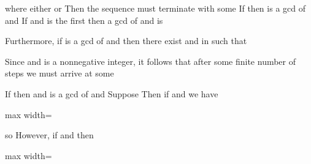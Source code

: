 \documentclass[11pt,oneside]{article}
\begin{document}
\begin{BookBody}
\noindent where either  or  Then the sequence  must terminate with some  If  then  is a gcd of  and  If  and  is the first  then a gcd of  and  is 

\end{BookBody}

\BookNarrativetrue

\begin{BookBody}

Furthermore, if  is a gcd of  and  then there exist \BookInline{\lambda } and \BookInline{\mu } in  such that 

 Since  and  is a nonnegative integer, it follows that after some finite number of steps we must arrive at some 

If  then  and  is a gcd of  and  Suppose  Then if  and  we have

\begin{center}\begin{adjustbox}{max width=\linewidth}\end{adjustbox}\end{center}

\noindent so  However, if  and  then

\begin{center}\begin{adjustbox}{max width=\linewidth}\end{adjustbox}\end{center}


\end{BookBody}
\end{document}
